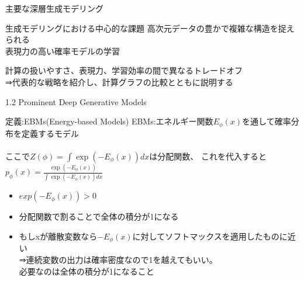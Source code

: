 \begin{frame}{主要な深層生成モデリング}
    \begin{block}{生成モデリングにおける中心的な課題}
        \centering 高次元データの豊かで複雑な構造を捉えられる\\表現力の高い確率モデルの学習\\
    \end{block}
    \vspace{1em}
計算の扱いやすさ、表現力、学習効率の間で異なるトレードオフ\\
⇒代表的な戦略を紹介し、計算グラフの比較とともに説明する
\end{frame}
\begin{frame}{1.2 Prominent Deep Generative Models}
    \begin{block}{定義:EBMs(Energy-based Models)}
        EBMs:エネルギー関数$\mathit{E}_{\phi}(x)$を通して確率分布を定義するモデル\\
        \\
        \vspace{1em}
        ここで$Z(\phi)=\int \exp(-\mathit{E}_{\phi}(x))dx$は分配関数、
        これを代入すると\\
        {\Large$p_{\phi}(x)=\frac{\exp(-\mathit{E}_{\phi}(x))}{\int \exp(-\mathit{E}_{\phi}(x))dx}$}\\
        \begin{itemize}
            \item $exp(-\mathit{E}_{\phi}(x))>0$
            \item 分配関数で割ることで全体の積分が1になる
            \item もしxが離散変数なら$-E_{\phi}(x)$に対してソフトマックスを適用したものに近い\\
            ⇒連続変数の出力は確率密度なので1を越えてもいい。\\
            必要なのは全体の積分が1になること\\
        \end{itemize}
    \end{block}
\end{frame}
